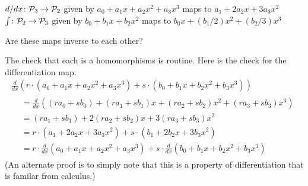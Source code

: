 \begin{exercises}
    \begin{exparts}
      \partsitem \( \mbox{$d/dx\colon \mathcal{P}_3\to \mathcal{P}_2$} \)
        given by \( a_0+a_1x+a_2x^2+a_3x^3 \) maps to
        \( a_1+2a_2x+3a_3x^2 \)
      \partsitem \( \mbox{$\int\colon \mathcal{P}_2\to \mathcal{P}_3$} \) given by
        \( b_0+b_1x+b_2x^2 \) maps to \( b_0x+(b_1/2)x^2+(b_2/3)x^3 \)
    \end{exparts}
    Are these maps inverse to each other?
    \begin{answer}
      The check that each is a homomorphisms is routine.
      Here is the check for the differentiation map.
      \begin{multline*}
        \frac{d}{dx}(r\cdot (a_0+a_1x+a_2x^2+a_3x^3)
                    +s\cdot (b_0+b_1x+b_2x^2+b_3x^3))                 \\
        \begin{aligned}
           &=\frac{d}{dx}((ra_0+sb_0)+(ra_1+sb_1)x+(ra_2+sb_2)x^2
                                                    +(ra_3+sb_3)x^3)  \\
           &=(ra_1+sb_1)+2(ra_2+sb_2)x+3(ra_3+sb_3)x^2         \\
           &=r\cdot (a_1+2a_2x+3a_3x^2)+s\cdot (b_1+2b_2x+3b_3x^2)         \\
           &=r\cdot \frac{d}{dx}(a_0+a_1x+a_2x^2+a_3x^3)
                    +s\cdot \frac{d}{dx} (b_0+b_1x+b_2x^2+b_3x^3)
        \end{aligned}
      \end{multline*}
      (An alternate proof is to simply note that this is a 
      property of differentiation that is familar from calculus.)


\end{answer}
\end{exercises}
